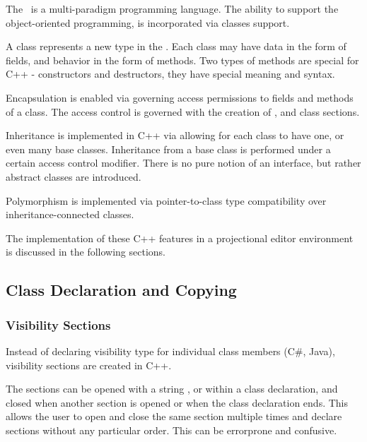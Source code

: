 
The \cpppl\ is a multi-paradigm programming language. The ability to support the object-oriented programming,
is incorporated via classes support. 

A class represents a new type in the \cpppl. Each class may have data in the 
form of fields, and behavior in the form of methods. Two types of methods are special for
C++ - constructors and destructors, they have special meaning and syntax.

Encapsulation is enabled via governing access permissions to fields and methods of a class.
The access control is governed with the creation of ,  and 
class sections.

Inheritance is implemented in C++ via allowing for each class to have one, or even many base classes.
Inheritance from a base class is performed under a certain access control modifier. There is no pure notion 
of an interface, but rather abstract classes are introduced.

Polymorphism is implemented via pointer-to-class type compatibility over inheritance-connected classes.

The implementation of these C++ features in a projectional editor environment is discussed in the
following sections.


\subsection{Class Declaration and Copying}
\label{section:classes}




\subsubsection{Visibility Sections}
\label{visibilitysections}


Instead of declaring visibility type for individual class members (C\#, Java), visibility sections are created
in C++. 

The sections can be opened with a string ,  or 
within a class declaration, and closed when another section is opened or when the class declaration
ends. This allows the user to open and close the same section multiple times and declare sections
without any particular order. This can be errorprone and confusive.

